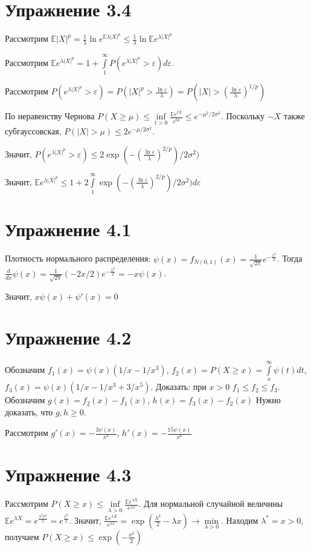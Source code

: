 \documentclass[a4paper]{article}
\def\eps{\varepsilon}
\begin{document}
\section*{Упражнение 3.4}
Рассмотрим $\mathbb{E}|X|^p=\frac{1}{\lambda}\ln e^{\mathbb{E}\lambda|X|^p}\leqslant\frac{1}{\lambda}\ln\mathbb{E} e^{\lambda|X|^p}$

Рассмотрим $\mathbb{E}e^{\lambda |X|^p}=1+\int\limits_1^\infty P(e^{\lambda |X|^p}>\eps)d\eps$.

Рассмотрим $P(e^{\lambda |X|^p}>\eps)=P(|X|^p>\frac{\ln\eps}{\lambda})=P(|X|>(\frac{\ln\eps}{\lambda})^{1/p})$

По неравенству Чернова $P(X\geqslant \mu)\leqslant \inf\limits_{t>0}\frac{\mathbb{E} e^{tX}}{e^{t\mu}}\leqslant e^{-\mu^2/2\sigma^2}$. Поскольку $-X$ также субгауссовская, $P(|X|>\mu)\leqslant 2e^{-\mu/2\sigma^2}$.

Значит, $P(e^{\lambda |X|^p}>\eps)\leqslant 2\exp(-(\frac{\ln\eps}{\lambda})^{2/p})/2\sigma^2)$

Значит, $\mathbb{E}e^{\lambda |X|^p}\leqslant 1+2\int\limits_1^\infty \exp(-(\frac{\ln\eps}{\lambda})^{2/p})/2\sigma^2)d\eps$
\section*{Упражнение 4.1}
Плотность нормального распределения: $\psi(x)=f_{N(0,1)}(x)=\frac{1}{\sqrt{2\pi}}e^{-\frac{x^2}{2}}$. Тогда $\frac{d}{dx}\psi(x)=\frac{1}{\sqrt{2\pi}}(-2x/2)e^{-\frac{x^2}{2}}=-x\psi(x)$.

Значит, $\boxed{x\psi(x)+\psi'(x)=0}$
\section*{Упражнение 4.2}
Обозначим $f_1(x)=\psi(x)(1/x-1/x^3)$, $f_2(x)=P(X\geqslant x)=\int\limits_x^\infty\psi(t)dt$, $f_3(x)=\psi(x)(1/x-1/x^3+3/x^5)$. Доказать: при $x>0$ $f_1\leqslant f_2\leqslant f_3$. Обозначим $g(x)=f_2(x)-f_1(x)$, $h(x)=f_3(x)-f_2(x)$ Нужно доказать, что $g,h\geqslant 0$.

Рассмотрим $g'(x)=-\frac{3\psi(x)}{x^4}$, $h'(x)=-\frac{15\psi(x)}{x^6}$
\section*{Упражнение 4.3}
Рассмотрим $P(X\geqslant x)\leqslant\inf\limits_{\lambda > 0}\frac{\mathbb{E}e^{\lambda X}}{e^{\lambda x}}$. Для нормальной случайной величины $\mathbb{E}e^{\lambda X}=e^{\frac{\lambda^2\sigma^2}{2}}=e^{\frac{\lambda^2}{2}}$. Значит, $\frac{\mathbb{E}e^{\lambda X}}{e^{\lambda x}}=\exp(\frac{\lambda^2}{2}-\lambda x)\to\min\limits_{\lambda > 0}$. Находим $\lambda^*=x>0$, получаем $P(X\geqslant x)\leqslant \exp(-\frac{x^2}{2})$
\end{document}

